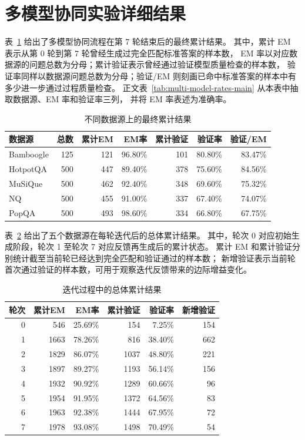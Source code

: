 \section{多模型协同实验详细结果}

表~\ref{tab:appendix-multi-model-final} 给出了多模型协同流程在第 7 轮结束后的最终累计结果。
其中，累计 EM 表示从第 0 轮到第 7 轮曾经生成过完全匹配标准答案的样本数，
EM 率以对应数据源的问题总数为分母；累计验证表示曾经通过验证模型质量检查的样本数，
验证率同样以数据源问题总数为分母；验证/EM 则刻画已命中标准答案的样本中有多少进一步通过过程质量检查。
正文表~\ref{tab:multi-model-rates-main} 从本表中抽取数据源、EM 率和验证率三列，
并将 EM 率表述为准确率。

\begin{table}[htbp]
\caption{不同数据源上的最终累计结果}
\label{tab:appendix-multi-model-final}
\vspace{0.5em}\centering\wuhao
\begin{tabular}{lrrrrrr}
\toprule
数据源 & 总数 & 累计EM & EM率 & 累计验证 & 验证率 & 验证/EM \\
\midrule
Bamboogle & 125 & 121 & 96.80\% & 101 & 80.80\% & 83.47\% \\
HotpotQA & 500 & 447 & 89.40\% & 378 & 75.60\% & 84.56\% \\
MuSiQue & 500 & 462 & 92.40\% & 348 & 69.60\% & 75.32\% \\
NQ & 500 & 455 & 91.00\% & 337 & 67.40\% & 74.07\% \\
PopQA & 500 & 493 & 98.60\% & 334 & 66.80\% & 67.75\% \\
\bottomrule
\end{tabular}
\end{table}

表~\ref{tab:appendix-multi-model-iteration} 给出了五个数据源在每轮迭代后的总体累计结果。
其中，轮次 0 对应初始生成阶段，轮次 1 至轮次 7 对应反馈再生成后的累计状态。
累计 EM 和累计验证分别统计截至当前轮已经达到完全匹配和验证通过的样本数；
新增验证表示当前轮首次通过验证的样本数，可用于观察迭代反馈带来的边际增益变化。

\begin{table}[htbp]
\caption{迭代过程中的总体累计结果}
\label{tab:appendix-multi-model-iteration}
\vspace{0.5em}\centering\wuhao
\begin{tabular}{rrrrrr}
\toprule
轮次 & 累计EM & EM率 & 累计验证 & 验证率 & 新增验证 \\
\midrule
0 & 546 & 25.69\% & 154 & 7.25\% & 154 \\
1 & 1663 & 78.26\% & 816 & 38.40\% & 662 \\
2 & 1829 & 86.07\% & 1037 & 48.80\% & 221 \\
3 & 1897 & 89.27\% & 1193 & 56.14\% & 156 \\
4 & 1932 & 90.92\% & 1289 & 60.66\% & 96 \\
5 & 1954 & 91.95\% & 1372 & 64.56\% & 83 \\
6 & 1963 & 92.38\% & 1444 & 67.95\% & 72 \\
7 & 1978 & 93.08\% & 1498 & 70.49\% & 54 \\
\bottomrule
\end{tabular}
\end{table}

